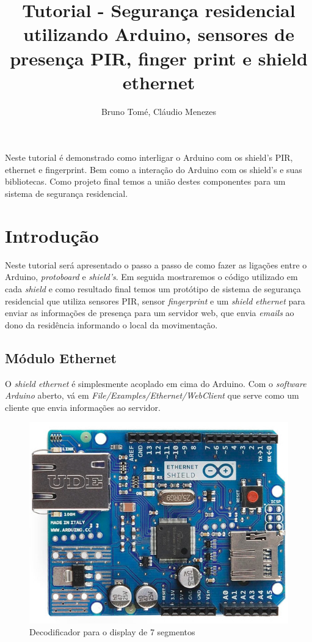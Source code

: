 \documentclass[13pt,a4]{article}
\title{Tutorial - Segurança residencial utilizando Arduino, sensores de presença PIR, finger print e shield ethernet   }
\author{Bruno Tomé, Cláudio Menezes }
\begin{document}
 

\maketitle

\begin{resumo}
	 Neste tutorial é demonstrado como interligar o Arduino com os shield's PIR, ethernet e fingerprint. Bem como a interação do Arduino com os shield's e suas bibliotecas. Como projeto final temos a união destes componentes para um sistema de segurança residencial.
\end{resumo}

\section{Introdução }
     Neste tutorial será apresentado o passo a passo de como fazer as ligações entre o Arduino, \textit{protoboard} e \textit{shield's}. Em seguida mostraremos o código utilizado em cada \textit{shield} e como resultado final temos um protótipo de sistema de segurança residencial que utiliza sensores PIR, sensor \textit{fingerprint} e um \textit{shield ethernet} para enviar as informações de presença para um servidor web, que envia \textit{emails} ao dono da residência informando o local da movimentação.

\subsection{Módulo Ethernet}
	O \textit{shield ethernet} é simplesmente acoplado em cima do Arduino. Com o \textit{software} \textit{Arduino} aberto, vá em \textit{File/Examples/Ethernet/WebClient} que serve como um cliente que envia informações ao servidor. 

\begin{figure}[!htb]
	\centering
	\includegraphics[scale=0.35]{etherPin.jpg}
	\caption{ Decodificador para o display de 7 segmentos	}
	\label{}
\end{figure}
\end{document}
